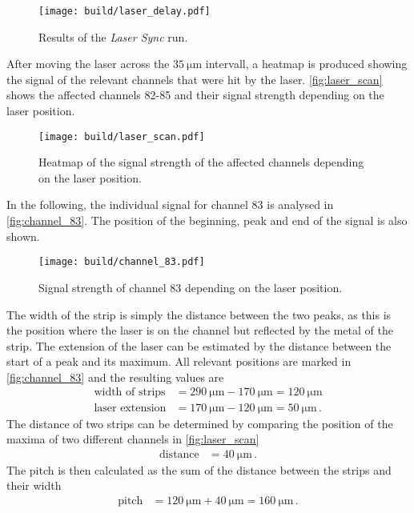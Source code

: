 \begin{figure}[H]
  \centering
  \texttt{[image: build/laser\_delay.pdf]}
  \caption{Results of the \textit{Laser Sync} run.}
  \label{fig:laser_delay}
\end{figure}

After moving the laser across the $\qty{35}{\micro\meter}$ intervall, a heatmap is produced
showing the signal of the relevant channels that were hit by the laser. 
\autoref{fig:laser_scan} shows the affected channels 82-85 and their signal strength depending
on the laser position.

\begin{figure}[H]
  \centering
  \texttt{[image: build/laser\_scan.pdf]}
  \caption{Heatmap of the signal strength of the affected channels depending on the laser position.}
  \label{fig:laser_scan}
\end{figure}

In the following, the individual signal for channel 83 is analysed in \autoref{fig:channel_83}.
The position of the beginning, peak and end of the signal is also shown.

\begin{figure}[H]
  \centering
  \texttt{[image: build/channel\_83.pdf]}
  \caption{Signal strength of channel 83 depending on the laser position.}
  \label{fig:channel_83}
\end{figure}

The width of the strip is simply the distance between the two peaks, as this is the position where the laser
is on the channel but reflected by the metal of the strip. The extension of the laser can be estimated by
the distance between the start of a peak and its maximum. All relevant positions are marked in
\autoref{fig:channel_83} and the resulting values are
\begin{align*}
  \text{width of strips} &= \qty{290}{\micro\meter} - \qty{170}{\micro\meter} = \qty{120}{\micro\meter} \\
  \text{laser extension} &= \qty{170}{\micro\meter} - \qty{120}{\micro\meter} = \qty{50}{\micro\meter} \, .
\end{align*}
The distance of two strips can be determined by comparing the position of the maxima of two different channels
in \autoref{fig:laser_scan}
\begin{align*}
  \text{distance} &= \qty{40}{\micro\meter} \, .
\end{align*}
The pitch is then calculated as the sum of the distance between the strips and their width
\begin{align*}
  \text{pitch} &= \qty{120}{\micro\meter} + \qty{40}{\micro\meter} = \qty{160}{\micro\meter} \, .
\end{align*}

